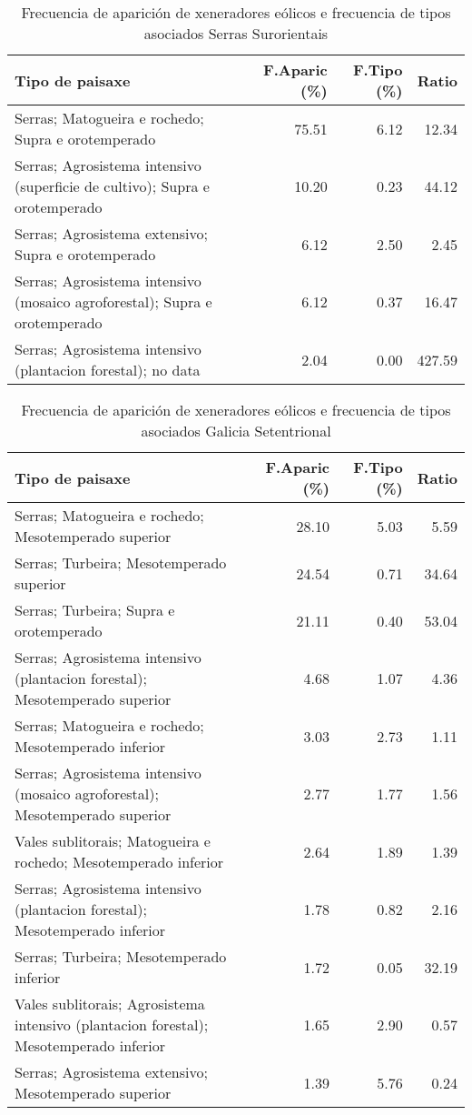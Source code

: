 \begin{table}[p]
\centering
\caption{Frecuencia de aparición de xeneradores eólicos e frecuencia de tipos asociados Serras Surorientais} 
\label{veolico9}
\begin{tabular}{lrrr}
  \hline
Tipo de paisaxe & F.Aparic (\%) & F.Tipo (\%) & Ratio \\ 
  \hline
Serras; Matogueira e rochedo; Supra e orotemperado & 75.51 & 6.12 & 12.34 \\ 
  Serras; Agrosistema intensivo (superficie de cultivo); Supra e orotemperado & 10.20 & 0.23 & 44.12 \\ 
  Serras; Agrosistema extensivo; Supra e orotemperado & 6.12 & 2.50 & 2.45 \\ 
  Serras; Agrosistema intensivo (mosaico agroforestal); Supra e orotemperado & 6.12 & 0.37 & 16.47 \\ 
  Serras; Agrosistema intensivo (plantacion forestal); no data & 2.04 & 0.00 & 427.59 \\ 
   \hline
\end{tabular}
\end{table}
\begin{table}[p]
\centering
\caption{Frecuencia de aparición de xeneradores eólicos e frecuencia de tipos asociados Galicia Setentrional} 
\label{veolico10}
\begin{tabular}{lrrr}
  \hline
Tipo de paisaxe & F.Aparic (\%) & F.Tipo (\%) & Ratio \\ 
  \hline
Serras; Matogueira e rochedo; Mesotemperado superior & 28.10 & 5.03 & 5.59 \\ 
  Serras; Turbeira; Mesotemperado superior & 24.54 & 0.71 & 34.64 \\ 
  Serras; Turbeira; Supra e orotemperado & 21.11 & 0.40 & 53.04 \\ 
  Serras; Agrosistema intensivo (plantacion forestal); Mesotemperado superior & 4.68 & 1.07 & 4.36 \\ 
  Serras; Matogueira e rochedo; Mesotemperado inferior & 3.03 & 2.73 & 1.11 \\ 
  Serras; Agrosistema intensivo (mosaico agroforestal); Mesotemperado superior & 2.77 & 1.77 & 1.56 \\ 
  Vales sublitorais; Matogueira e rochedo; Mesotemperado inferior & 2.64 & 1.89 & 1.39 \\ 
  Serras; Agrosistema intensivo (plantacion forestal); Mesotemperado inferior & 1.78 & 0.82 & 2.16 \\ 
  Serras; Turbeira; Mesotemperado inferior & 1.72 & 0.05 & 32.19 \\ 
  Vales sublitorais; Agrosistema intensivo (plantacion forestal); Mesotemperado inferior & 1.65 & 2.90 & 0.57 \\ 
  Serras; Agrosistema extensivo; Mesotemperado superior & 1.39 & 5.76 & 0.24 \\ 
   \hline
\end{tabular}
\end{table}
